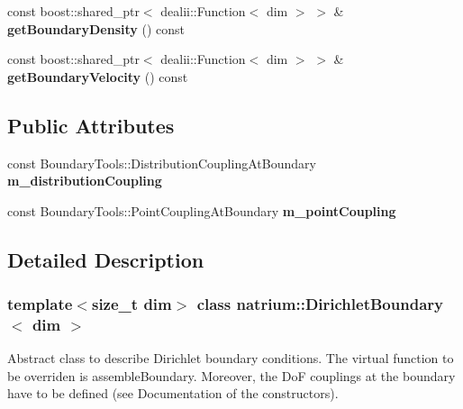 \begin{DoxyCompactItemize}
\item 
\hypertarget{classnatrium_1_1DirichletBoundary_a539369decad08b0b7d926347b8a40760}{
const boost::shared\_\-ptr$<$ dealii::Function$<$ dim $>$ $>$ \& {\bfseries getBoundaryDensity} () const }
\label{classnatrium_1_1DirichletBoundary_a539369decad08b0b7d926347b8a40760}

\item 
\hypertarget{classnatrium_1_1DirichletBoundary_a639ded592d64c585e5956aeaa29be9aa}{
const boost::shared\_\-ptr$<$ dealii::Function$<$ dim $>$ $>$ \& {\bfseries getBoundaryVelocity} () const }
\label{classnatrium_1_1DirichletBoundary_a639ded592d64c585e5956aeaa29be9aa}

\end{DoxyCompactItemize}
\subsection*{Public Attributes}
\begin{DoxyCompactItemize}
\item 
\hypertarget{classnatrium_1_1DirichletBoundary_a9b166780351261b373326b5267254ed0}{
const BoundaryTools::DistributionCouplingAtBoundary {\bfseries m\_\-distributionCoupling}}
\label{classnatrium_1_1DirichletBoundary_a9b166780351261b373326b5267254ed0}

\item 
\hypertarget{classnatrium_1_1DirichletBoundary_a28411a6d35cd5ddbb056fc061635092c}{
const BoundaryTools::PointCouplingAtBoundary {\bfseries m\_\-pointCoupling}}
\label{classnatrium_1_1DirichletBoundary_a28411a6d35cd5ddbb056fc061635092c}

\end{DoxyCompactItemize}


\subsection{Detailed Description}
\subsubsection*{template$<$size\_\-t dim$>$ class natrium::DirichletBoundary$<$ dim $>$}

Abstract class to describe Dirichlet boundary conditions. The virtual function to be overriden is assembleBoundary. Moreover, the DoF couplings at the boundary have to be defined (see Documentation of the constructors). 

